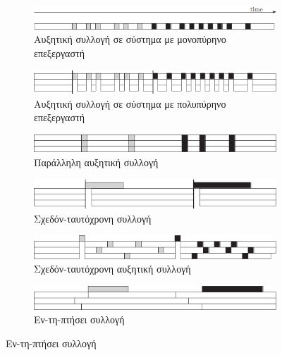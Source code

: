 \begin{greek}
\begin{figure}[H]
  \centering
  \begin{subfigure}{1.0\textwidth}
    \includegraphics{figures/conc_1a}
    \caption{Αυξητική συλλογή σε σύστημα με μονοπύρηνο επεξεργαστή}
  \end{subfigure}

\begin{subfigure}[b]{1.0\textwidth}
  \includegraphics{figures/conc_1b}
  \caption{Αυξητική συλλογή σε σύστημα με πολυπύρηνο επεξεργαστή}
\end{subfigure}
  
  \begin{subfigure}[b]{1.0\textwidth}
    \includegraphics{figures/conc_1c}
    \caption{Παράλληλη αυξητική συλλογή}
  \end{subfigure}
  
  \begin{subfigure}[b]{1.0\textwidth}
    \includegraphics{figures/conc_1d}
    \caption{Σχεδόν-ταυτόχρονη συλλογή}
  \end{subfigure}
  
  \begin{subfigure}[b]{1.0\textwidth}
    \includegraphics{figures/conc_1e}
    \caption{Σχεδόν-ταυτόχρονη αυξητική συλλογή}
  \end{subfigure}
  
  \begin{subfigure}[b]{1.0\textwidth}
    \includegraphics{figures/conc_1f}
    \caption{Εν-τη-πτήσει συλλογή}
  \end{subfigure}
  

\end{figure}
\end{greek}
